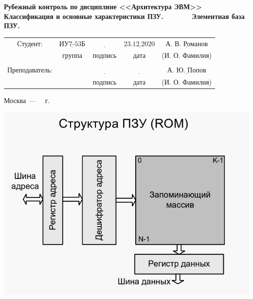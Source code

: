 \documentclass[a4paper,12pt]{article}
\begin{document}
	
	\begin{center}
		\noindent\begin{minipage}{1.3\textwidth}\centering
			\Large\textbf{  Рубежный контроль по  }\newline
			\Large\textbf{ дисциплине <<Архитектура ЭВМ>>}\newline\newline\newline
			\textbf{Классификация и основные характеристики ПЗУ.}\newline
			\textbf{ ~~~~~~   Элементная база ПЗУ. }\newline\newline\newline\newline
		\end{minipage}
	\end{center}
	
	\begin{center}
		\begin{tabular}{ccccc}
			Студент: & $\underline{\text{ИУ7-53Б}}$ & $\underline{\text{~~~~~~~~~~~}}$ & $\underline{\text{23.12.2020}}$ & $\underline{\text{А. В. Романов}}$ \\
			& \footnotesize группа & \footnotesize подпись & \footnotesize дата  & \footnotesize (И. О. Фамилия) \\
			&  &  &  & \\
			Преподаватель: & \textbf{} & $\underline{\text{~~~~~~~~~~~}}$ & $\underline{\text{~~~~~~~~~~~~}}$ & $\underline{\text{А. Ю. Попов}}$ \\
			&  & \footnotesize подпись & \footnotesize дата  & \footnotesize (И. О. Фамилия) \\
		\end{tabular}
	\end{center}
	
	
	\begin{center}
		\vfill
		Москва~---~\the\year
		~г.
	\end{center}
	\clearpage
	
	
	\begin{center}
		\noindent \includegraphics[scale=0.5]{1.png}\newline
	\end{center}
\end{document}

